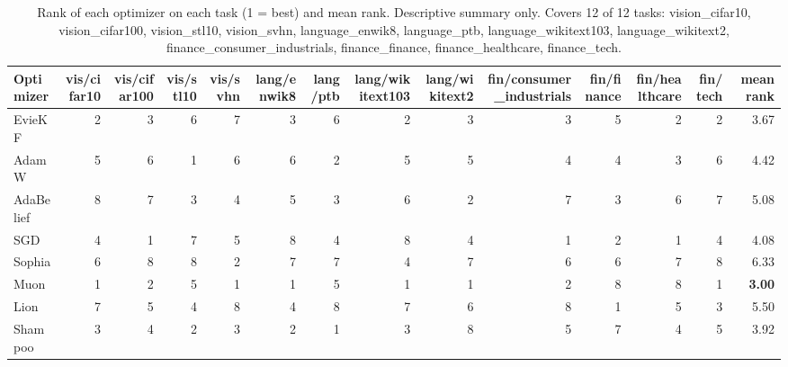 \begin{table}[t]
\centering
\small
\caption{Rank of each optimizer on each task (1 = best) and mean rank. Descriptive summary only. Covers 12 of 12 tasks: vision\_cifar10, vision\_cifar100, vision\_stl10, vision\_svhn, language\_enwik8, language\_ptb, language\_wikitext103, language\_wikitext2, finance\_consumer\_industrials, finance\_finance, finance\_healthcare, finance\_tech.}
\label{tab:table2_ranks}
\begin{tabular}{lrrrrrrrrrrrrr}
\toprule
Optimizer & vis/cifar10 & vis/cifar100 & vis/stl10 & vis/svhn & lang/enwik8 & lang/ptb & lang/wikitext103 & lang/wikitext2 & fin/consumer\_industrials & fin/finance & fin/healthcare & fin/tech & mean rank \\
\midrule
EvieKF & 2 & 3 & 6 & 7 & 3 & 6 & 2 & 3 & 3 & 5 & 2 & 2 & 3.67 \\
AdamW & 5 & 6 & 1 & 6 & 6 & 2 & 5 & 5 & 4 & 4 & 3 & 6 & 4.42 \\
AdaBelief & 8 & 7 & 3 & 4 & 5 & 3 & 6 & 2 & 7 & 3 & 6 & 7 & 5.08 \\
SGD & 4 & 1 & 7 & 5 & 8 & 4 & 8 & 4 & 1 & 2 & 1 & 4 & 4.08 \\
Sophia & 6 & 8 & 8 & 2 & 7 & 7 & 4 & 7 & 6 & 6 & 7 & 8 & 6.33 \\
Muon & 1 & 2 & 5 & 1 & 1 & 5 & 1 & 1 & 2 & 8 & 8 & 1 & \textbf{3.00} \\
Lion & 7 & 5 & 4 & 8 & 4 & 8 & 7 & 6 & 8 & 1 & 5 & 3 & 5.50 \\
Shampoo & 3 & 4 & 2 & 3 & 2 & 1 & 3 & 8 & 5 & 7 & 4 & 5 & 3.92 \\
\bottomrule
\end{tabular}
\end{table}
